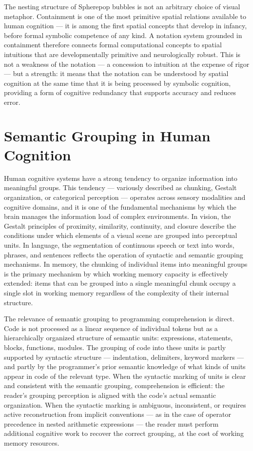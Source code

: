 \documentclass[12pt,openany]{book}
\theoremstyle{plain}
\theoremstyle{definition}
\theoremstyle{remark}
\begin{document}
The nesting structure of Spherepop bubbles is not an arbitrary choice of visual metaphor. Containment is one of the most primitive spatial relations available to human cognition — it is among the first spatial concepts that develop in infancy, before formal symbolic competence of any kind. A notation system grounded in containment therefore connects formal computational concepts to spatial intuitions that are developmentally primitive and neurologically robust. This is not a weakness of the notation — a concession to intuition at the expense of rigor — but a strength: it means that the notation can be understood by spatial cognition at the same time that it is being processed by symbolic cognition, providing a form of cognitive redundancy that supports accuracy and reduces error.

\section{Semantic Grouping in Human Cognition}

Human cognitive systems have a strong tendency to organize information into meaningful groups. This tendency — variously described as chunking, Gestalt organization, or categorical perception — operates across sensory modalities and cognitive domains, and it is one of the fundamental mechanisms by which the brain manages the information load of complex environments. In vision, the Gestalt principles of proximity, similarity, continuity, and closure describe the conditions under which elements of a visual scene are grouped into perceptual units. In language, the segmentation of continuous speech or text into words, phrases, and sentences reflects the operation of syntactic and semantic grouping mechanisms. In memory, the chunking of individual items into meaningful groups is the primary mechanism by which working memory capacity is effectively extended: items that can be grouped into a single meaningful chunk occupy a single slot in working memory regardless of the complexity of their internal structure.

The relevance of semantic grouping to programming comprehension is direct. Code is not processed as a linear sequence of individual tokens but as a hierarchically organized structure of semantic units: expressions, statements, blocks, functions, modules. The grouping of code into these units is partly supported by syntactic structure — indentation, delimiters, keyword markers — and partly by the programmer's prior semantic knowledge of what kinds of units appear in code of the relevant type. When the syntactic marking of units is clear and consistent with the semantic grouping, comprehension is efficient: the reader's grouping perception is aligned with the code's actual semantic organization. When the syntactic marking is ambiguous, inconsistent, or requires active reconstruction from implicit conventions — as in the case of operator precedence in nested arithmetic expressions — the reader must perform additional cognitive work to recover the correct grouping, at the cost of working memory resources.
\end{document}
